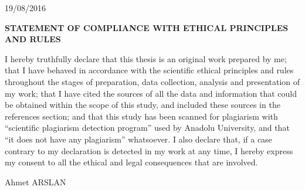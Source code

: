 \newpage
{}

\begin{flushright}
19/08/2016
\end{flushright}

\begin{center}
\textbf{STATEMENT OF COMPLIANCE WITH ETHICAL PRINCIPLES AND RULES}
\end{center}

I hereby truthfully declare that this thesis is an original work prepared by me; that I have behaved in accordance with the scientific ethical principles and rules throughout the stages of preparation, data collection, analysis and presentation of my work; that I have cited the sources of all the data and information that could be obtained within the scope of this study, and included these sources in the references section; and that this study has been scanned for plagiarism with ``scientific plagiarism detection program'' used by Anadolu University, and that ``it does not have any plagiarism'' whatsoever. I also declare that, if a case contrary to my declaration is detected in my work at any time, I hereby express my consent to all the ethical and legal consequences that are involved.


\vspace*{2.15cm}

\begin{flushright}
Ahmet ARSLAN
\end{flushright}